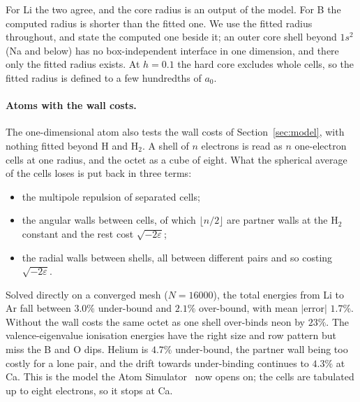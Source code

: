 \documentclass[11pt]{article}
\begin{document}
For Li the two agree, and the core radius is an output of the model. For B the computed radius is
shorter than the fitted one. We use the fitted radius throughout, and state the computed one beside
it; an outer core shell beyond $1s^2$ (Na and below) has no box-independent interface in one
dimension, and there only the fitted radius exists. At $h = 0.1$ the hard core excludes whole
cells, so the fitted radius is defined to a few hundredths of $a_0$.

\paragraph{Atoms with the wall costs.} The one-dimensional atom also tests the wall costs of
Section~\ref{sec:model}, with nothing fitted beyond H and H$_2$. A shell of $n$ electrons is read as
$n$ one-electron cells at one radius, and the octet as a cube of eight. What the spherical average of
the cells loses is put back in three terms:
\begin{itemize}
\item the multipole repulsion of separated cells;
\item the angular walls between cells, of which $\lfloor n/2\rfloor$ are partner walls at the H$_2$
constant and the rest cost $\sqrt{-2\varepsilon}$;
\item the radial walls between shells, all between different pairs and so costing $\sqrt{-2\varepsilon}$.
\end{itemize}
Solved directly on a converged mesh ($N=16000$), the total energies from Li to Ar fall between $3.0\%$
under-bound and $2.1\%$ over-bound, with mean $|$error$|$ $1.7\%$. Without the wall costs the
same octet as one shell over-binds neon by $23\%$. The valence-eigenvalue ionisation energies have the
right size and row pattern but miss the B and O dips. Helium is $4.7\%$ under-bound, the partner wall
being too costly for a lone pair, and the drift towards under-binding continues to $4.3\%$ at Ca. This is
the model the Atom Simulator~\cite{atoms} now opens on; the cells are tabulated up to eight electrons, so
it stops at Ca.
\end{document}
